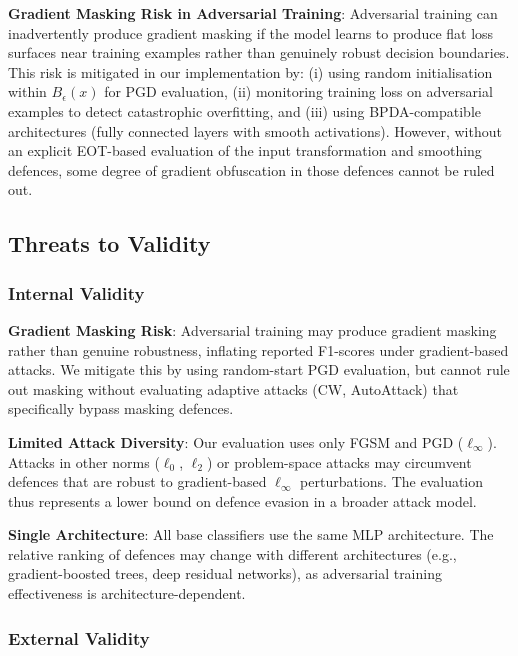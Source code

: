 \documentclass[conference]{IEEEtran}
\begin{document}
\textbf{Gradient Masking Risk in Adversarial Training}: Adversarial training can inadvertently produce gradient masking \cite{athalye2018} if the model learns to produce flat loss surfaces near training examples rather than genuinely robust decision boundaries. This risk is mitigated in our implementation by: (i) using random initialisation within $B_\epsilon(x)$ for PGD evaluation, (ii) monitoring training loss on adversarial examples to detect catastrophic overfitting, and (iii) using BPDA-compatible architectures (fully connected layers with smooth activations). However, without an explicit EOT-based evaluation of the input transformation and smoothing defences, some degree of gradient obfuscation in those defences cannot be ruled out.

\subsection{Threats to Validity}

\subsubsection{Internal Validity}

\textbf{Gradient Masking Risk}: Adversarial training may produce gradient masking rather than genuine robustness, inflating reported F1-scores under gradient-based attacks. We mitigate this by using random-start PGD evaluation, but cannot rule out masking without evaluating adaptive attacks (CW, AutoAttack) that specifically bypass masking defences.

\textbf{Limited Attack Diversity}: Our evaluation uses only FGSM and PGD ($\ell_\infty$). Attacks in other norms ($\ell_0$, $\ell_2$) or problem-space attacks \cite{pierazzi2020} may circumvent defences that are robust to gradient-based $\ell_\infty$ perturbations. The evaluation thus represents a lower bound on defence evasion in a broader attack model.

\textbf{Single Architecture}: All base classifiers use the same MLP architecture. The relative ranking of defences may change with different architectures (e.g., gradient-boosted trees, deep residual networks), as adversarial training effectiveness is architecture-dependent.

\subsubsection{External Validity}
\end{document}
